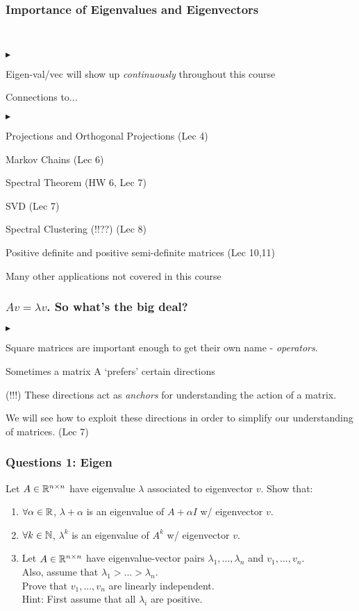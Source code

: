 \documentclass[table]{beamer}
\renewenvironment{itemize}
\renewenvironment{enumerate}%
{\begin{list}{\arabic{enumi}.}%
      {\setlength{\leftmargin}{2.5em}%
       \setlength{\itemsep}{-\parsep}%
       \setlength{\topsep}{-\parskip}%
       \usecounter{enumi}}%
 }{\end{list}}
\renewenvironment{itemize}%
{\begin{list}{$\blacktriangleright$}%
      {\setlength{\leftmargin}{2.5em}%
       \setlength{\itemsep}{-\parsep}%
       \setlength{\topsep}{-\parskip}%
       \usecounter{enumi}}%
 }{\end{list}}
\begin{document}
\begin{frame}
\frametitle{Importance of Eigenvalues and Eigenvectors}
\\
\bigskip
\begin{itemize}
\item Eigen-val/vec will show up \textit{continuously} throughout this course
\item Connections to...
\begin{itemize}
\item Projections and Orthogonal Projections (Lec 4)
\item Markov Chains (Lec 6)
\item Spectral Theorem (HW 6, Lec 7)
\item SVD (Lec 7)
\item Spectral Clustering (!!??) (Lec 8)
\item Positive definite and positive semi-definite matrices (Lec 10,11)
\end{itemize}
\item Many other applications not covered in this course
\end{itemize}
\end{frame}


\begin{frame}
\frametitle{$Av=\lambda v$. So what's the big deal?}
\begin{itemize}
\item Square matrices are important enough to get their own name - \textit{operators}.
\item Sometimes a matrix A `prefers' certain directions
\item (!!!) These directions act as \textit{anchors} for understanding the action of a matrix.
\item We will see how to exploit these directions in order to simplify our understanding of matrices. (Lec 7)
\end{itemize}
\end{frame}



\begin{frame}
\frametitle{Questions 1: Eigen}
Let $A \in \mathbb{R}^{n\times n}$ have eigenvalue $\lambda$ associated to eigenvector $v$.
Show that:
\begin{enumerate}
\item $\forall \alpha \in \mathbb{R}$, $\lambda+\alpha$ is an eigenvalue of $A+\alpha I$ w/ eigenvector $v$.
\item $\forall k \in \mathbb{N}$, $\lambda^k$ is an eigenvalue of $A^k$ w/ eigenvector $v$.
\item Let $A\in \mathbb{R}^{n \times n}$ have eigenvalue-vector pairs $\lambda_1,...,\lambda_n$ and $v_1,...,v_n$. \\
Also, assume that $\lambda_1>...>\lambda_n$.\\
Prove that $v_1,...,v_n$ are linearly independent.\\

\medskip
Hint: First assume that all $\lambda_i$ are positive.
\end{enumerate}
\end{frame}
\end{document}
